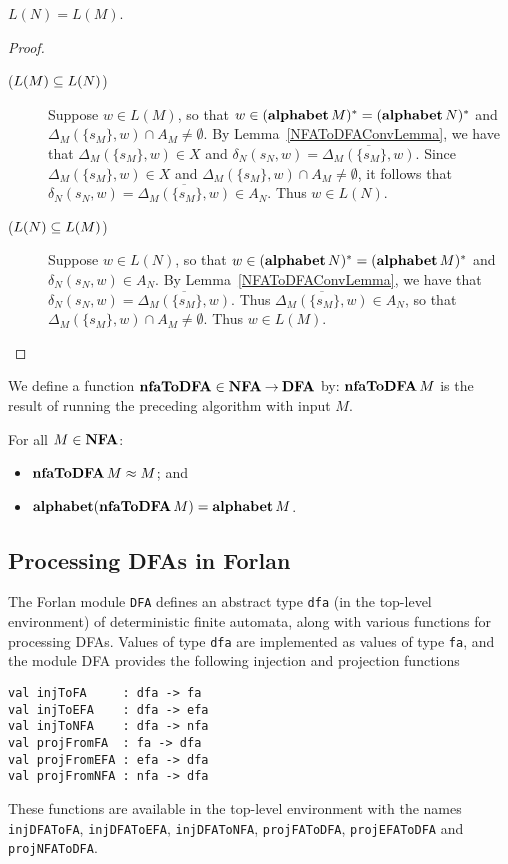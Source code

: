 \begin{lemma}
$L(N)=L(M)$.
\end{lemma}

\begin{proof}
\begin{description}
\item[\quad($L(M)\subseteq L(N)$)] Suppose $w\in L(M)$, so that
  $w\in(\mathbf{alphabet}\,M)^*=(\mathbf{alphabet}\,N)^*$ and $\Delta_M(\{s_M\},w)\cap
  A_M\neq\emptyset$.  By Lemma~\ref{NFAToDFAConvLemma}, we have that
  $\Delta_M(\{s_M\},w)\in X$ and
  $\delta_N(s_N,w)=\overline{\Delta_M(\{s_M\},w)}$.  Since
  $\Delta_M(\{s_M\},w)\in X$ and $\Delta_M(\{s_M\},w)\cap
  A_M\neq\emptyset$, it follows that
  $\delta_N(s_N,w)=\overline{\Delta_M(\{s_M\},w)} \in A_N$.  Thus
  $w\in L(N)$.

\item[\quad($L(N)\subseteq L(M)$)] Suppose $w\in L(N)$, so that
  $w\in(\mathbf{alphabet}\,N)^*=(\mathbf{alphabet}\,M)^*$ and $\delta_N(s_N,w)\in
  A_N$.  By Lemma~\ref{NFAToDFAConvLemma}, we have that
  $\delta_N(s_N,w)= \overline{\Delta_M(\{s_M\},w)}$.  Thus
  $\overline{\Delta_M(\{s_M\},w)}\in A_N$, so that
  $\Delta_M(\{s_M\},w)\cap A_M\neq\emptyset$.  Thus $w\in L(M)$.
\end{description}
\end{proof}

We define a function $\mathbf{nfaToDFA}\in\mathbf{NFA}\mathbin{\to}\mathbf{DFA}$ by: $\mathbf{nfaToDFA}\,M$ is
the result of running the preceding algorithm with input $M$.

\begin{theorem}
\label{NFAToDFATheorem}
For all $M\in\mathbf{NFA}$:
\begin{itemize}
\item $\mathbf{nfaToDFA}\,M\approx M$; and

\item $\mathbf{alphabet}(\mathbf{nfaToDFA}\,M)=\mathbf{alphabet}\,M$.
\end{itemize}
\end{theorem}

\subsection{Processing DFAs in Forlan}

The Forlan module \texttt{DFA} defines an abstract type \texttt{dfa}
(in the top-level environment) of deterministic finite automata,
along with various functions for processing DFAs.
Values of type \texttt{dfa} are implemented as values of type \texttt{fa}, and
the module DFA provides the following injection and projection functions
\begin{verbatim}
val injToFA     : dfa -> fa
val injToEFA    : dfa -> efa
val injToNFA    : dfa -> nfa
val projFromFA  : fa -> dfa
val projFromEFA : efa -> dfa
val projFromNFA : nfa -> dfa
\end{verbatim}
These functions are available in the top-level environment with the
names \texttt{injDFAToFA}, \texttt{injDFAToEFA}, \texttt{injDFAToNFA},
\texttt{projFAToDFA}, \texttt{projEFAToDFA} and \texttt{projNFAToDFA}.

